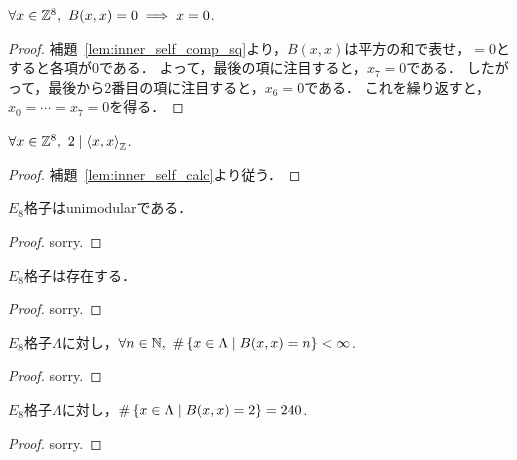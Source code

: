 \begin{thm}
  \label{thm:inner_self_eq_zero}
  \leanok
  $\forall x \in \mathbb{Z}^8,\ B(x, x) = 0 \implies x = 0$.
\end{thm}

\begin{proof}
  \leanok
  補題~\ref{lem:inner_self_comp_sq}より，$B(x, x)$は平方の和で表せ，$= 0$とすると各項が$0$である．
  よって，最後の項に注目すると，$x_7 = 0$である．
  したがって，最後から2番目の項に注目すると，$x_6 = 0$である．
  これを繰り返すと，$x_0 = \cdots = x_7 = 0$を得る．
\end{proof}

\begin{thm}
  \label{thm:even}
  \leanok
  $\forall x \in \mathbb{Z}^8,\ 2 \mid \left\langle x, x \right\rangle_{\mathbb{Z}}$.
\end{thm}

\begin{proof}
  \leanok
  補題~\ref{lem:inner_self_calc}より従う．
\end{proof}

\begin{thm}
  \label{thm:unimodular}
  \leanok
  $E_8$格子はunimodularである．
\end{thm}

\begin{proof}
  sorry.
\end{proof}

\begin{thm}
  \label{thm:exists_E8}
  \leanok
  $E_8$格子は存在する．
\end{thm}

\begin{proof}
  sorry.
\end{proof}

\begin{thm}
  $E_8$格子$\Lambda$に対し，$\forall n \in \mathbb{N},\ \#\left\lbrace x \in \Lambda \mathrel{} \middle| \mathrel{} B(x, x) = n \right\rbrace < \infty$.
\end{thm}

\begin{proof}
  sorry.
\end{proof}

\begin{lem}
  \label{lem:card_norm_2}
  \leanok
  $E_8$格子$\Lambda$に対し，$\#\left\lbrace x \in \Lambda \mathrel{} \middle| \mathrel{} B(x, x) = 2 \right\rbrace = 240$.
\end{lem}

\begin{proof}
  sorry.
\end{proof}
